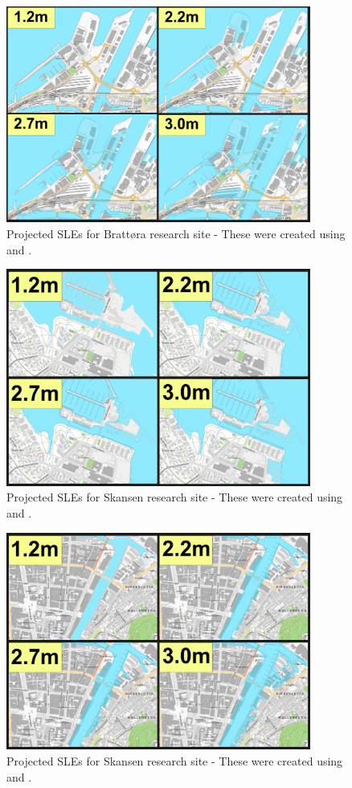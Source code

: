 \begin{figure}[H]
    \centering
    \includegraphics[width=10cm]{fig_sle/brattora-sle-num.png}
    \caption{Projected SLEs for Brattøra research site - These were created using \cite{kartverket_se_2021} and \cite{stormflo_database_stormflo_2021}. }
    \label{fig:sle-brattora-num}
\end{figure}

\begin{figure}[H]
    \centering
    \includegraphics[width=10cm]{fig_sle/grillstad-sle-num.png}
    \caption{Projected SLEs for Skansen research site - These were created using \cite{kartverket_se_2021} and \cite{stormflo_database_stormflo_2021}. }
    \label{fig:sle-grillstad-num}
\end{figure}

\begin{figure}[H]
    \centering
    \includegraphics[width=10cm]{fig_sle/nidelva-sle-num.png}
    \caption{Projected SLEs for Skansen research site - These were created using \cite{kartverket_se_2021} and \cite{stormflo_database_stormflo_2021}. }
    \label{fig:sle-nidelva-num}
\end{figure}

